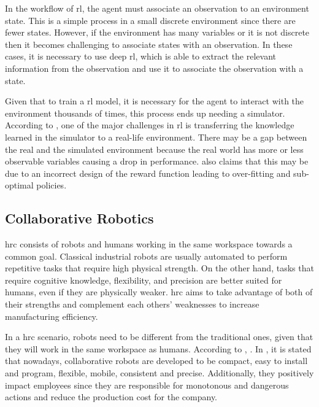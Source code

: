 In the workflow of \acl{rl}, the agent must associate an observation to an environment state. This is a simple process in a small discrete environment since there are fewer states. However, if the environment has many variables or it is not discrete then it becomes challenging to associate states with an observation. In these cases, it is necessary to use deep \acl{rl}, which is able to extract the relevant information from the observation and use it to associate the observation with a state.

Given that to train a \acl{rl} model, it is necessary for the agent to interact with the environment thousands of times, this process ends up needing a simulator. According to \textcite{Li2023}, one of the major challenges in \acs{rl} is transferring the knowledge learned in the simulator to a real-life environment. There may be a gap between the real and the simulated environment because the real world has more or less observable variables causing a drop in performance. \textcite{Ahmed2020} also claims that this may be due to an incorrect design of the reward function leading to over-fitting and sub-optimal policies.

\subsection{Collaborative Robotics}
\label{subsection:collaborative_robotics}

\acf{hrc} consists of robots and humans working in the same workspace towards a common goal. Classical industrial robots are usually automated to perform repetitive tasks that require high physical strength. On the other hand, tasks that require cognitive knowledge, flexibility, and precision are better suited for humans, even if they are physically weaker. \acs{hrc} aims to take advantage of both of their strengths and complement each others' weaknesses to increase manufacturing efficiency.

In a \acs{hrc} scenario, robots need to be different from the traditional ones, given that they will work in the same workspace as humans. According to \textcite{Castro2021}, . In \cite{CobotsWW}, it is stated that nowadays, collaborative robots are developed to be compact, easy to install and program, flexible, mobile, consistent and precise. Additionally, they positively impact employees since they are responsible for monotonous and dangerous actions and reduce the production cost for the company.

